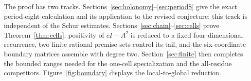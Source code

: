 The proof has two tracks. Sections~\ref{sec:holonomy}--\ref{sec:period8}
give the exact period-eight calculation and its application to the revised
conjecture; this track is independent of the Schur estimates.
Sections~\ref{sec:chain}--\ref{sec:cells} prove
Theorem~\ref{thm:cells}: positivity of $cI-A^2$ is reduced to a fixed
four-dimensional recurrence, two finite rational premise sets control its
tail, and the six-coordinate boundary matrices assemble with degree two.
Section~\ref{sec:finite} then completes the bounded ranges needed for the
one-cell specialization and the all-residue competitors.
Figure~\ref{fig:boundary} displays the local-to-global reduction.
